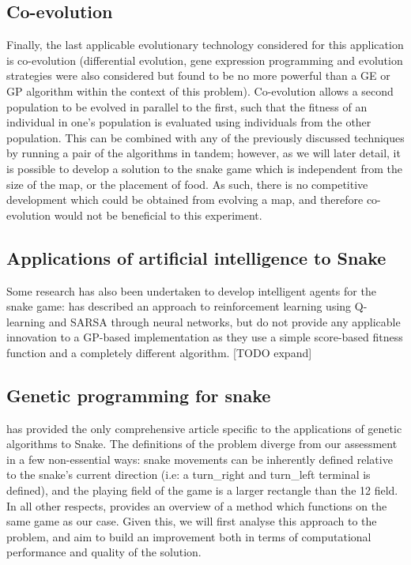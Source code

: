 \documentclass[british,10pt,a4paper]{article}
\begin{document}
\subsection{Co-evolution}
Finally, the last applicable evolutionary technology considered for this application is co-evolution (differential evolution, gene expression programming and evolution strategies were also considered but found to be no more powerful than a GE or GP algorithm within the context of this problem). Co-evolution allows a second population to be evolved in parallel to the first, such that the fitness of an individual in one's population is evaluated using individuals from the other population. This can be combined with any of the previously discussed techniques by running a pair of the algorithms in tandem; however, as we will later detail, it is possible to develop a solution to the snake game which is independent from the size of the map, or the placement of food. As such, there is no competitive development which could be obtained from evolving a map, and therefore co-evolution would not be beneficial to this experiment.


\subsection{Applications of artificial intelligence to Snake}
Some research has also been undertaken to develop intelligent agents for the snake game: \citet{Bowei_Ma_undated-tl} has described an approach to reinforcement learning using Q-learning and SARSA through neural networks, but do not provide any applicable innovation to a GP-based implementation as they use a simple score-based fitness function and a completely different algorithm.  [TODO expand]

\subsection{Genetic programming for snake}
\label{subsec:gp_snake}
\citet{Ehlis2000-sz} has provided the only comprehensive article specific to the applications of genetic algorithms to Snake. The definitions of the problem diverge from our assessment in a few non-essential ways: snake movements can be inherently defined relative to the snake's current direction (i.e: a turn\_right and turn\_left terminal is defined), and the playing field of the game is a larger rectangle than the 12 field. In all other respects, \citeauthor{Ehlis2000-sz} provides
an overview of a method which functions on the same game as our case. Given this, we will first analyse this approach to the problem, and aim to build an improvement both in terms of computational performance and quality of the solution. \newline
\end{document}

